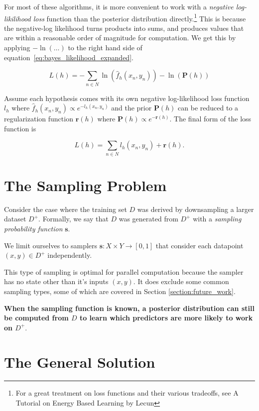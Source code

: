 \documentclass[twoside]{article}
\begin{document}
For most of these algorithms, it is more convenient to work with a \textit{negative log-likilihood loss} function than the posterior distribution directly.\footnote{For a great treatment on loss functions and their various tradeoffs, see A Tutorial on Energy Based Learning by Lecun\cite{lecun}} This is because the negative-log likelihood turns products into sums, and produces values that are within a reasonable order of magnitude for computation. We get this by applying \(-\ln(\ldots)\) to the right hand side of equation~\ref{eq:bayes_likelihood_expanded}.

\[L(h)=-\sum_{n \in N} \ln(\hat{f}_h(x_n,y_n))-\ln(\mathbf{P}(h))\]

Assume each hypothesis comes with its own negative log-likelihood loss function \(l_h\) where \(\hat{f}_h(x_n,y_n)\propto e^{-l_h(x_n,y_n)}\) and the prior \(\mathbf{P}(h)\) can be reduced to a regularization function \(\mathbf{r}(h)\) where \(\mathbf{P}(h)\propto e^{-\mathbf{r}(h)}\). The final form of the loss function is

\[L(h)=\sum_{n \in N} l_h(x_n,y_n)+\mathbf{r}(h).\]

\section{The Sampling Problem}
\label{section:problem}

Consider the case where the training set \(D\) was derived by downsampling a larger dataset \(D^+\). Formally, we say that \(D\) was generated from \(D^+\) with a \textit{sampling probability function} \(\mathbf{s}\).

We limit ourselves to samplers \(\mathbf{s}: X \times Y \rightarrow \left [ 0, 1\right ]\) that consider each datapoint \((x, y) \in D^+\) independently.

This type of sampling is optimal for parallel computation because the sampler has no state other than it's inputs \((x, y)\). It does exclude some common sampling types, some of which are covered in Section \ref{section:future_work}.

\textbf{When the sampling function is known, a posterior distribution can still be computed from \(D\) to learn which predictors are more likely to work on \(D^+\)}.

\section{The General Solution}
\label{section:solution}
\end{document}
